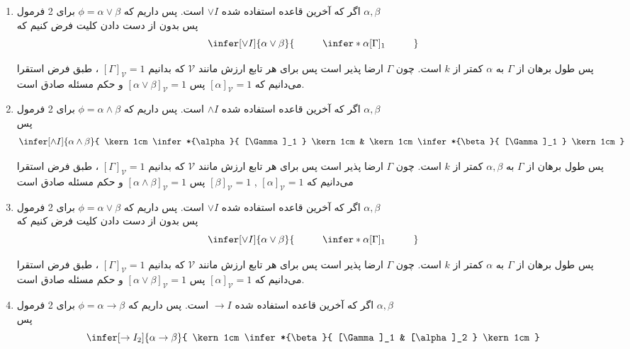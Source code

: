 \begin {ans}
\begin {enumerate}
		
		
		\item اگر که آخرین قاعده استفاده شده
		$\vee I$ است. پس داریم 
		که
		 $\phi = \alpha \vee \beta$ 
		برای 2 فرمول
		 $\alpha , \beta$\\
		  پس بدون از دست دادن کلیت فرض کنیم که
		$$
		\infer[\vee I]{\alpha \vee \beta}{
			\kern 1cm	
			\infer*{\alpha}{
				[\Gamma]_1
			}
			\kern 1cm
		}
		$$
		
		پس طول برهان از 
		$\Gamma$
		به
		 $\alpha$
		  کمتر از $k$ است.
		 چون $\Gamma$ ارضا پذیر است پس برای هر تابع ارزش مانند $\mathcal {V}$ که بدانیم
		$[\Gamma]_\mathcal{V} = 1$ 
		، طبق فرض استقرا می‌دانیم که
		$[\alpha]_\mathcal{V} = 1$
		پس 
		$[\alpha \vee \beta]_\mathcal{V} = 1$
		و حکم مسئله صادق است.
		
		
		
		\item اگر که آخرین قاعده استفاده شده
		$\wedge I$ است. پس داریم 
		که
		$\phi = \alpha \wedge \beta$ 
		برای 2 فرمول
		$\alpha , \beta$\\
		پس 
		$$
		\infer[\wedge I]{\alpha \wedge \beta}{
			\kern 1cm	
			\infer*{\alpha}{
				[\Gamma]_1
			}
			\kern 1cm
			&
			\kern 1cm	
			\infer*{\beta}{
				[\Gamma]_1
			}
			\kern 1cm
		}
		$$
		
		پس طول برهان از 
		$\Gamma$
		به
		$\alpha , \beta$ 
		کمتر از $k$ است.
		چون $\Gamma$ ارضا پذیر است پس برای هر تابع ارزش مانند $\mathcal {V}$ که بدانیم
		$[\Gamma]_\mathcal{V} = 1$ 
		، طبق فرض استقرا می‌دانیم که
		$[\alpha]_\mathcal{V} = 1$ , $[\beta]_\mathcal{V} = 1$
		پس 
		$[\alpha \wedge \beta]_\mathcal{V} = 1$
		و حکم مسئله صادق است
		
		
		\item اگر که آخرین قاعده استفاده شده
		$\vee I$ است. پس داریم 
		که
		$\phi = \alpha \vee \beta$ 
		برای 2 فرمول
		$\alpha , \beta$\\
		پس بدون از دست دادن کلیت فرض کنیم که
		$$
		\infer[\vee I]{\alpha \vee \beta}{
			\kern 1cm	
			\infer*{\alpha}{
				[\Gamma]_1
			}
			\kern 1cm
		}
		$$
		
		پس طول برهان از 
		$\Gamma$
		به
		$\alpha$
		کمتر از $k$ است.
		چون $\Gamma$ ارضا پذیر است پس برای هر تابع ارزش مانند $\mathcal {V}$ که بدانیم
		$[\Gamma]_\mathcal{V} = 1$ 
		، طبق فرض استقرا می‌دانیم که
		$[\alpha]_\mathcal{V} = 1$
		پس 
		$[\alpha \vee \beta]_\mathcal{V} = 1$
		و حکم مسئله صادق است.
		
		
		
		\item اگر که آخرین قاعده استفاده شده
		$\to I$ است. پس داریم 
		که
		$\phi = \alpha \to \beta$ 
		برای 2 فرمول
		$\alpha , \beta$\\
		پس 
		$$
		\infer[\to I_2]{\alpha \to \beta}{
			\kern 1cm	
			\infer*{\beta}{
				[\Gamma]_1
				&
				[\alpha]_2
			}
			\kern 1cm
		}
		$$
		

\end{enumerate}
\end{ans}
